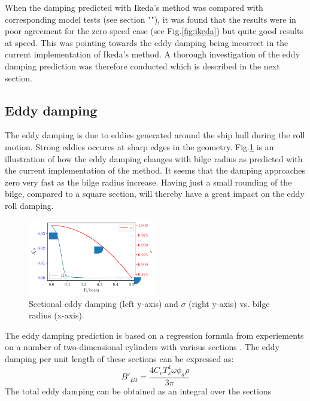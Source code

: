When the damping predicted with Ikeda's method was compared with
corresponding model tests (see section ""), it
was found that the results were in poor agreement for the zero speed
case (see Fig.\ref{fig:ikeda}) but quite good results at speed.
\quad This was pointing towards the eddy damping being incorrect in the
current implementation of Ikeda's method. A thorough investigation of
the eddy damping prediction was therefore conducted which is described
in the next section.
\subsection*{Eddy damping}\label{eddy-damping}
The eddy damping is due to eddies generated around the ship hull during
the roll motion. Strong eddies occures at sharp edges in the geometry.
Fig.\ref{fig:eddy_sigma} is an illustration of how the eddy
damping changes with bilge radius as predicted with the current
implementation of the method. It seems that the damping approaches zero
very fast as the bilge radius increase. Having just a small rounding of
the bilge, compared to a square section, will thereby have a great
impact on the eddy roll damping.
\begin{figure}[H]
\begin{center}\includegraphics[width = 0.5\textwidth]{figures/eddy_sigma.pdf}\end{center}
\vspace{-1cm}
\caption{Sectional eddy damping (left y-axis) and $\sigma$ (right y-axis) vs. bilge radius (x-axis).}
\label{fig:eddy_sigma}
\end{figure}
The eddy damping prediction is based on a regression formula from
experiements on a number of two-dimensional cylinders with various
sections \citep{7505983/4AFVVGNT}. The eddy damping per unit length of
these sections can be expressed as:
\begin{equation}
B'_{E0} = \frac{4 C_{r} T_{s}^{4} \omega \phi_{a} \rho}{3 \pi}
\label{eq:eddy_section}
\end{equation}
The total eddy damping can be obtained as an integral over the sections
